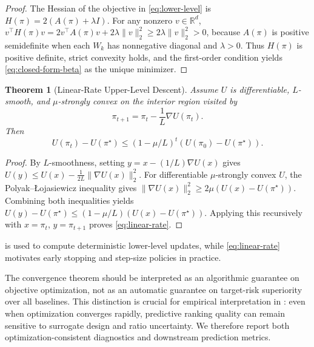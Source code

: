 \documentclass{article} %
\newtheorem{theorem}{Theorem}[section]
\begin{document}
\begin{proof}
The Hessian of the objective in \eqref{eq:lower-level} is \(H(\pi)=2(A(\pi)+\lambda I)\). For any nonzero \(v\in\mathbb{R}^d\),
\(
v^\top H(\pi)v=2v^\top A(\pi)v+2\lambda\|v\|_2^2\ge 2\lambda\|v\|_2^2>0
\),
because \(A(\pi)\) is positive semidefinite when each \(W_k\) has nonnegative diagonal and \(\lambda>0\). Thus \(H(\pi)\) is positive definite, strict convexity holds, and the first-order condition yields \eqref{eq:closed-form-beta} as the unique minimizer.
\end{proof}

\begin{theorem}[Linear-Rate Upper-Level Descent]
\label{thm:convergence}
Assume \(U\) is differentiable, \(L\)-smooth, and \(\mu\)-strongly convex on the interior region visited by
\begin{equation}
\pi_{t+1}=\pi_t-\frac{1}{L}\nabla U(\pi_t).
\label{eq:upper-step}
\end{equation}
Then
\begin{equation}
U(\pi_t)-U(\pi^{\star})\le(1-\mu/L)^t\left(U(\pi_0)-U(\pi^{\star})\right).
\label{eq:linear-rate}
\end{equation}
\end{theorem}

\begin{proof}
By \(L\)-smoothness, setting \(y=x-(1/L)\nabla U(x)\) gives
\(U(y)\le U(x)-\frac{1}{2L}\|\nabla U(x)\|_2^2\).
For differentiable \(\mu\)-strongly convex \(U\), the Polyak--\L{}ojasiewicz inequality gives
\(\|\nabla U(x)\|_2^2\ge2\mu(U(x)-U(\pi^{\star}))\).
Combining both inequalities yields
\(U(y)-U(\pi^{\star})\le(1-\mu/L)(U(x)-U(\pi^{\star}))\).
Applying this recursively with \(x=\pi_t\), \(y=\pi_{t+1}\) proves \eqref{eq:linear-rate}.
\end{proof}

 is used to compute deterministic lower-level updates, while \eqref{eq:linear-rate} motivates early stopping and step-size policies in practice.

The convergence theorem should be interpreted as an algorithmic guarantee on objective optimization, not as an automatic guarantee on target-risk superiority over all baselines. This distinction is crucial for empirical interpretation in : even when optimization converges rapidly, predictive ranking quality can remain sensitive to surrogate design and ratio uncertainty. We therefore report both optimization-consistent diagnostics and downstream prediction metrics.
\end{document}
